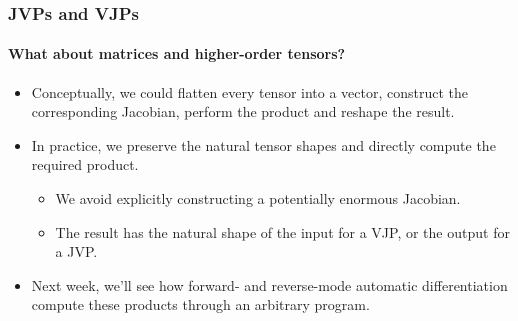 \documentclass[]{article}
\begin{document}
\begin{frame}
\frametitle{JVPs and VJPs}
\framesubtitle{What about matrices and higher-order tensors?}
\begin{itemize}
	\item Conceptually, we could flatten every tensor into a vector, construct the corresponding Jacobian, perform the product and reshape the result.
	\item In practice, we preserve the natural tensor shapes and directly compute the required product.
	\begin{itemize}
		\item We avoid explicitly constructing a potentially enormous Jacobian.
		\item The result has the natural shape of the input for a VJP, or the output for a JVP.
	\end{itemize}
	\item<+-> Next week, we'll see how forward- and reverse-mode automatic differentiation compute these products through an arbitrary program.
\end{itemize}
\end{frame}
\end{document}
